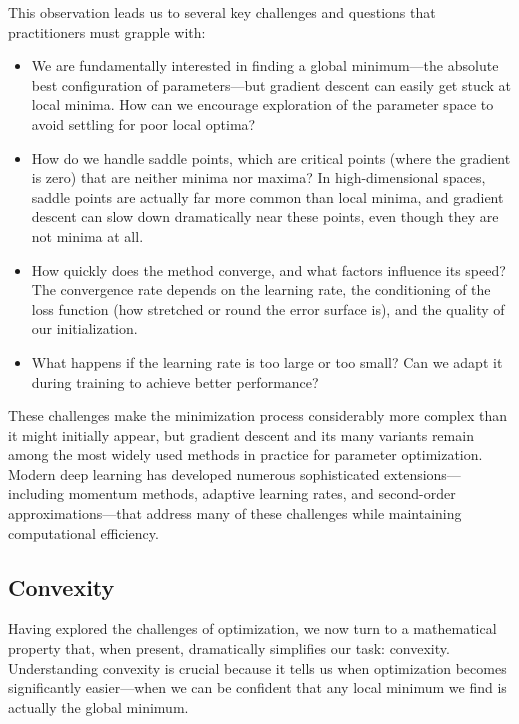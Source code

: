 This observation leads us to several key challenges and questions that practitioners must grapple with:
\begin{itemize}
\item We are fundamentally interested in finding a global minimum—the absolute best configuration of parameters—but gradient descent can easily get stuck at local minima. How can we encourage exploration of the parameter space to avoid settling for poor local optima?

\item How do we handle saddle points, which are critical points (where the gradient is zero) that are neither minima nor maxima? In high-dimensional spaces, saddle points are actually far more common than local minima, and gradient descent can slow down dramatically near these points, even though they are not minima at all.

\item How quickly does the method converge, and what factors influence its speed? The convergence rate depends on the learning rate, the conditioning of the loss function (how stretched or round the error surface is), and the quality of our initialization.

\item What happens if the learning rate is too large or too small? Can we adapt it during training to achieve better performance?
\end{itemize}

These challenges make the minimization process considerably more complex than it might initially appear, but gradient descent and its many variants remain among the most widely used methods in practice for parameter optimization. Modern deep learning has developed numerous sophisticated extensions—including momentum methods, adaptive learning rates, and second-order approximations—that address many of these challenges while maintaining computational efficiency.


\subsection*{Convexity}

Having explored the challenges of optimization, we now turn to a mathematical property that, when present, dramatically simplifies our task: convexity. Understanding convexity is crucial because it tells us when optimization becomes significantly easier—when we can be confident that any local minimum we find is actually the global minimum.

